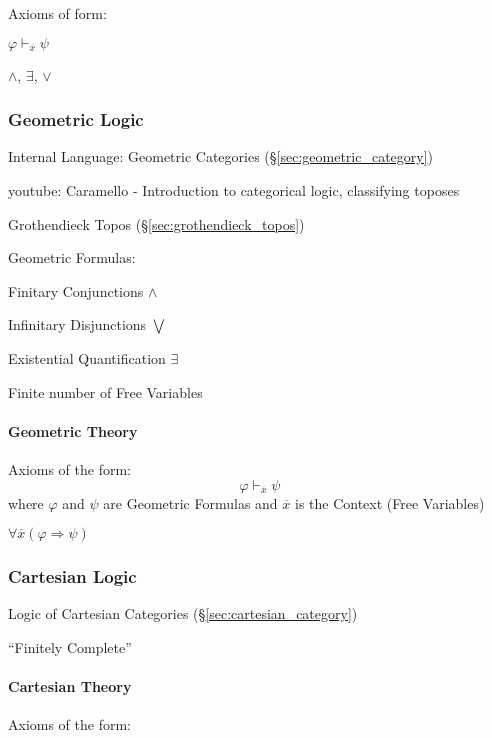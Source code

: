 Axioms of form:

$\varphi \vdash_{\overline{x}} \psi$

$\wedge$, $\exists$, $\vee$



\subsubsection{Geometric Logic}\label{sec:geometric_logic}

Internal Language: Geometric Categories
(\S\ref{sec:geometric_category})


youtube: Caramello - Introduction to categorical logic, classifying
toposes

Grothendieck Topos (\S\ref{sec:grothendieck_topos})

Geometric Formulas:

Finitary Conjunctions $\wedge$

Infinitary Disjunctions $\bigvee$

Existential Quantification $\exists$

Finite number of Free Variables



\paragraph{Geometric Theory}\label{sec:geometric_theory}\hfill

Axioms of the form:
\[
  \varphi \vdash_{\overline{x}} \psi
\]
where $\varphi$ and $\psi$ are Geometric Formulas and $\overline{x}$
is the Context (Free Variables) %

$\forall \overline{x} (\varphi \Rightarrow \psi)$



\subsubsection{Cartesian Logic}\label{sec:cartesian_logic}

Logic of Cartesian Categories (\S\ref{sec:cartesian_category})

``Finitely Complete''



\paragraph{Cartesian Theory}\label{sec:cartesian_theory}\hfill

Axioms of the form:


